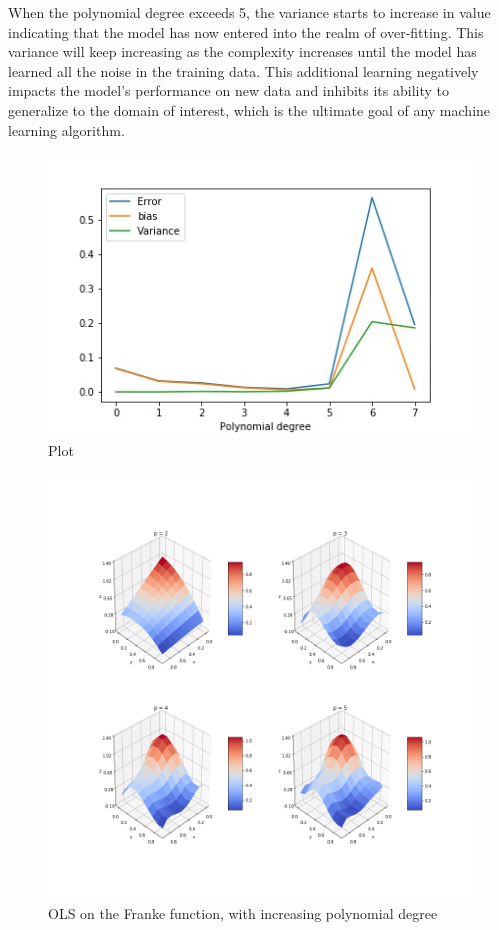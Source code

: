 \documentclass{article}
\begin{document}
When the polynomial degree exceeds 5, the variance starts to increase in value indicating that the model has now entered into the realm of over-fitting. This variance will keep increasing as the complexity increases until the model has learned all the noise in the training data. This additional learning negatively impacts the model’s performance on new data and inhibits its ability to generalize to the domain of interest, which is the ultimate goal of any machine learning algorithm.

\begin{figure}
\includegraphics[scale=0.5]{partBplot.jpg}
\centering
\caption{Plot}
\label{fig:plot}
\end{figure}

\begin{figure}
\includegraphics[scale=0.35]{frankePlots.png}
\caption{OLS on the Franke function, with increasing polynomial degree}
\end{figure}
\end{document}
